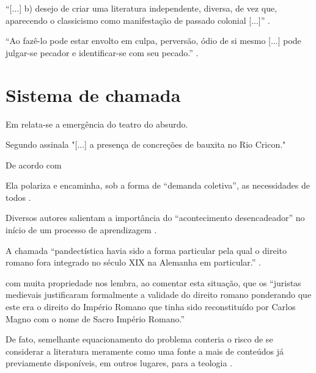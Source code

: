 \documentclass[a4paper]{article}
\begin{document}
“[...] b) desejo de criar uma literatura independente, diversa, de vez que,
aparecendo o classicismo como manifestação de passado colonial [...]”
\cite[v. 2, p. 12, grifo do autor]{candido1993}.

“Ao fazê-lo pode estar envolto em culpa, perversão, ódio de si mesmo [...]
pode julgar-se pecador e identificar-se com seu pecado.” \cite[v. 4, p. 463,
tradução nossa]{rahner1962}.


\section{Sistema de chamada}

Em  relata-se a emergência do teatro do
absurdo.

Segundo \textcite[32]{morais1955} assinala "[...] a presença de concreções de
bauxita no Rio Cricon."

\cite{barbosa1958}

\cite{barbosa1959}

\cite{barbosa1965a}

\cite{barbosa1965b}

De acordo com \textcite{reeside1927a}

\cite{reeside1927b}

\cites{dreyfuss1989}{dreyfuss1991}{dreyfuss1995}

\cites{cruz1998}{cruz1999}{cruz2000}

Ela polariza e encaminha, sob a forma de “demanda coletiva”, as necessidades
de todos \cites{fonseca1997}{paiva1997}{silva1997}.

Diversos autores salientam a importância do “acontecimento desencadeador” no
início de um processo de aprendizagem
\cites{cross1984}{knox1986}{mezirow1991}.

A chamada “pandectística havia sido a forma particular pela qual o direito
romano fora integrado no século XIX na Alemanha em particular.”
\cite[225]{lopes2000}.

\textcite[30]{bobbio1995} com muita propriedade nos lembra, ao comentar esta
situação, que os “juristas medievais justificaram formalmente a validade do
direito romano ponderando que este era o direito do Império Romano que tinha
sido reconstituído por Carlos Magno com o nome de Sacro Império Romano.”

De fato, semelhante equacionamento do problema conteria o risco de se
considerar a literatura meramente como uma fonte a mais de conteúdos já
previamente disponíveis, em outros lugares, para a teologia
\cite[3]{jossua1976}.
\end{document}

